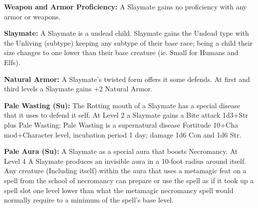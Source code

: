 \textbf{Weapon and Armor Proficiency:} A Slaymate gains no proficiency with any armor or weapons.

\textbf{Slaymate:} A Slaymate is a undead child. Slaymate gains the Undead type with the Unliving (subtype) keeping any subtype of their base race; being a child their size changes to one lower than their base creature (ie. Small for Humans and Elfs).

\textbf{Natural Armor:} A Slaymate's twisted form offers it some defends. At first and third levels a Slaymate gains +2 Natural Armor.

\textbf{Pale Wasting (Su):} The Rotting mouth of a Slaymate has a special disease that it uses to defend it self. At Level 2 a Slaymate gains a Bite attack 1d3+Str plus Pale Wasting; 
 Pale Wasting is a supernatural disease Fortitude 10+Cha mod+Character level, incubation period 1 day; damage 1d6 Con and 1d6 Str.
 
 \textbf{Pale Aura (Su):} A Slaymate as a special aura that boosts Necromancy. At Level 4 A Slaymate produces an invisible aura in a 10-foot radius around itself. Any creature (Including itself) within the aura that uses a metamagic feat on a spell from the school of necromancy can prepare or use the spell as if it took up a spell slot one level lower than what the metamagic necromancy spell would normally require to a minimum of the spell's base level.